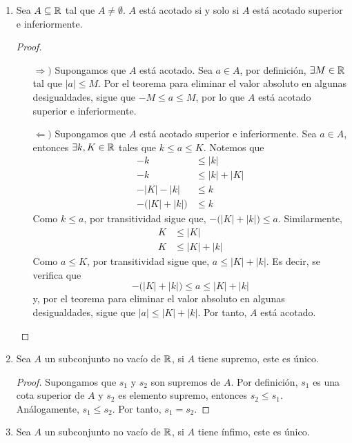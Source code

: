 \begin{enumerate}[label=\roman*)]
 \item Sea $A\subseteq \mathbb{R}$ tal que $A\neq \emptyset$. $A$ está acotado si y solo si $A$ está acotado superior e inferiormente.
 
 \begin{proof} \leavevmode
  \begin{itemize}
   \item[$\Rightarrow)$] Supongamos que $A$ está acotado. Sea $a\in A$, por definición, $\exists M\in \mathbb{R}$ tal que $|a|\leq M$. Por el teorema para eliminar el valor absoluto en algunas desigualdades, sigue que $-M\leq a \leq M$, por lo que $A$ está acotado superior e inferiormente.
   \item[$\Leftarrow)$] Supongamos que $A$ está acotado superior e inferiormente. Sea $a\in A$, entonces $\exists k, K\in \mathbb{R}$ tales que $k\leq a \leq K$. Notemos que
   \begin{align*}
    -k &\leq |k|\\
    -k &\leq |k| + |K|\\
    -|K|-|k| &\leq k\\
    - \big(|K|+|k|\big) &\leq k
   \end{align*}
   Como $k\leq a$, por transitividad sigue que, $-\big(|K|+|k|\big) \leq a$. Similarmente,
   \begin{align*}
    K &\leq |K|\\
    K &\leq |K| + |k|
   \end{align*}
   Como $a\leq K$, por transitividad sigue que, $a\leq |K|+|k|$. Es decir, se verifica que \[-\big(|K|+|k|\big) \leq a \leq |K|+|k|\]
   y, por el teorema para eliminar el valor absoluto en algunas desigualdades, sigue que $|a| \leq |K| + |k|$. Por tanto, $A$ está acotado. \qedhere
  \end{itemize}
 \end{proof}

 \item Sea $A$ un subconjunto no vacío de $\mathbb{R}$, si $A$ tiene supremo, este es único.
 
 \begin{proof} 
  Supongamos que $s_1$ y $s_2$ son supremos de $A$. Por definición, $s_1$ es una cota superior de $A$ y $s_2$ es elemento supremo, entonces $s_2\leq s_1$. Análogamente, $s_1\leq s_2$. Por tanto, $s_1=s_2$.
 \end{proof}

 \item Sea $A$ un subconjunto no vacío de $\mathbb{R}$, si $A$ tiene ínfimo, este es único.
 

\end{enumerate}
